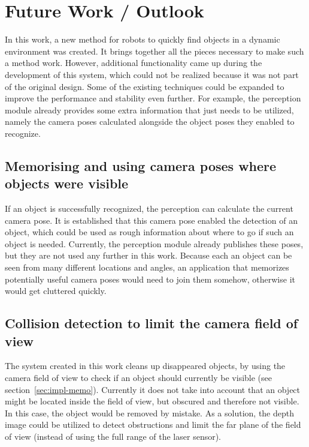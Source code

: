 \chapter{Future Work / Outlook}
In this work, a new method for robots to quickly find objects in a dynamic environment was created. It brings together all the pieces necessary to make such a method work. However, additional functionality came up during the development of this system, which could not be realized because it was not part of the original design. Some of the existing techniques could be expanded to improve the performance and stability even further. For example, the perception module already provides some extra information that just needs to be utilized, namely the camera poses calculated alongside the object poses they enabled to recognize.

\section*{Memorising and using camera poses where objects were visible}
If an object is successfully recognized, the perception can calculate the current camera pose. It is established that this camera pose enabled the detection of an object, which could be used as rough information about where to go if such an object is needed. Currently, the perception module already publishes these poses, but they are not used any further in this work. Because each an object can be seen from many different locations and angles, an application that memorizes potentially useful camera poses would need to join them somehow, otherwise it would get cluttered quickly.

\section*{Collision detection to limit the camera field of view}
The system created in this work cleans up disappeared objects, by using the camera field of view to check if an object should currently be visible (see section~\ref{sec:impl-memo}). Currently it does not take into account that an object might be located inside the field of view, but obscured and therefore not visible. In this case, the object would be removed by mistake. As a solution, the depth image could be utilized to detect obstructions and limit the far plane of the field of view (instead of using the full range of the laser sensor).

